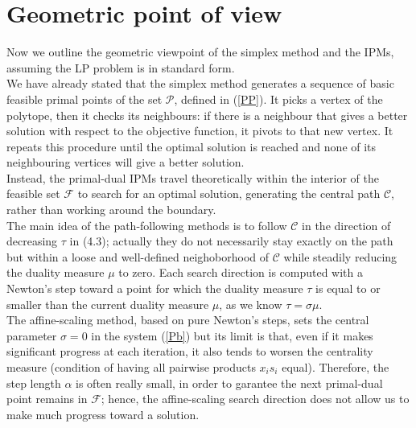\documentclass[a4paper,10 pt,titlepage,twoside]{report}
\theoremstyle{plain}
\theoremstyle{definition}
\theoremstyle{remark}
\begin{document}
{{\section*{Geometric point of view}
Now we outline the geometric viewpoint of the simplex method and the IPMs, assuming the LP problem is in standard form.\\
We have already stated that the simplex method generates a sequence of basic feasible primal points of the set $\mathcal{P}$, defined in (\ref{PP}). It picks a vertex of the polytope, then it checks its neighbours: if there is a neighbour that gives a
better solution with respect to the objective function, it pivots to that new vertex.
It repeats this procedure until the optimal solution is reached and none of its neighbouring vertices will give
a better solution.\\Instead, the primal-dual IPMs travel theoretically within the interior of the feasible set $\mathcal{F}$ to search for an optimal solution, generating the central path $\mathcal{C}$, rather than working around the boundary.\\ The main idea of the path-following methods is to follow $\mathcal{C}$ in the direction of decreasing $\tau$ in (4.3); actually they do not necessarily stay exactly on the path but within a loose and well-defined neighoborhood of $\mathcal{C}$ while steadily reducing the duality measure $\mu$ to zero. Each search direction is computed with a Newton's step toward a point for which the duality measure $\tau$ is equal to or smaller than the current duality measure $\mu$, as we know $\tau=\sigma\mu$. \\
The affine-scaling method, based on pure Newton's steps, sets the central parameter $\sigma= 0$ in the system (\ref{Pb}) but its limit is that,
even if it makes significant progress at each iteration, it also tends to worsen the centrality measure (condition of having all pairwise products $x_{i}s_{i}$ equal). Therefore, the step length $\alpha$ is often really small, in order to garantee the next primal-dual point remains in $\mathcal{F}$; hence, the affine-scaling search direction does not allow us to make much progress toward a solution.\\ 
}}
\end{document}
